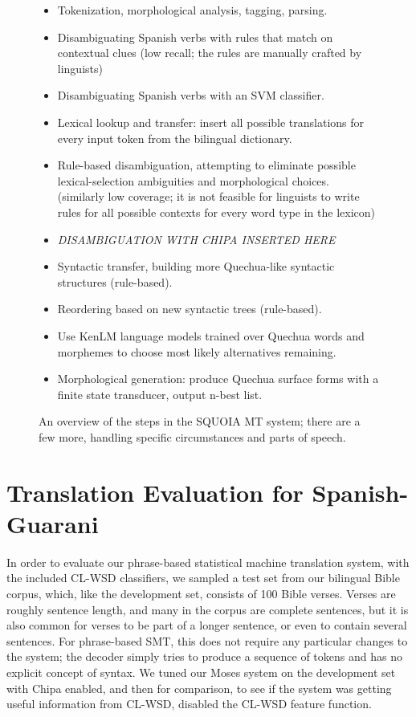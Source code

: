 \begin{figure}
  \begin{itemize}
  \item Tokenization, morphological analysis, tagging, parsing.
  \item Disambiguating Spanish verbs with rules that match on contextual clues
  (low recall; the rules are manually crafted by linguists)
  \item Disambiguating Spanish verbs with an SVM classifier.
  \item Lexical lookup and transfer: insert all possible translations for every
  input token from the bilingual dictionary.
  \item Rule-based disambiguation, attempting to eliminate possible
  lexical-selection ambiguities and morphological choices. (similarly low
  coverage; it is not feasible for linguists to write rules for all possible
  contexts for every word type in the lexicon)
  \item \emph{DISAMBIGUATION WITH CHIPA INSERTED HERE}
  \item Syntactic transfer, building more Quechua-like syntactic structures
  (rule-based).
  \item Reordering based on new syntactic trees (rule-based).
  \item Use KenLM language models trained over Quechua words and morphemes to
  choose most likely alternatives remaining.
  \item Morphological generation: produce Quechua surface forms with a finite
  state transducer, output n-best list.
  \end{itemize}

  \caption{An overview of the steps in the SQUOIA MT system; there are a few
  more, handling specific circumstances and parts of speech.}
  \label{fig:squoia-steps}
\end{figure}


\section{Translation Evaluation for Spanish-Guarani}
\label{sec:integration-es-gn-evaluation}

In order to evaluate our phrase-based statistical machine translation system,
with the included CL-WSD classifiers, we sampled a test set from our bilingual
Bible corpus, which, like the development set, consists of 100 Bible verses.
Verses are roughly sentence length, and many in the corpus are complete
sentences, but it is also common for verses to be part of a longer sentence, or
even to contain several sentences. For phrase-based SMT, this does not require
any particular changes to the system; the decoder simply tries to produce a
sequence of tokens and has no explicit concept of syntax.
We tuned our Moses system on the development set with Chipa enabled, and then
for comparison, to see if the system was getting useful information from
CL-WSD, disabled the CL-WSD feature function.

